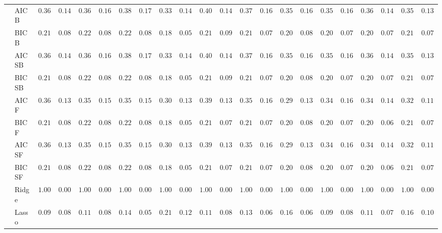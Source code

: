 \begin{tabular}{p{0.2cm}p{1cm}|p{0.6cm}p{0.6cm}|p{0.6cm}p{0.6cm}p{0.6cm}p{0.6cm}p{0.6cm}p{0.6cm}|p{0.6cm}p{0.6cm}p{0.6cm}p{0.6cm}p{0.6cm}p{0.6cm}|p{0.6cm}p{0.6cm}p{0.6cm}p{0.6cm}p{0.6cm}p{0.6cm}}
 & AIC B  & $0.3667$ & $0.1401$ & $0.3633$ & $0.1681$ & $0.3867$ & $0.1739$ & $0.3350$ & $0.1451$ & $0.4017$ & $0.1423$ & $0.3767$ & $0.1617$ & $0.3500$ & $0.1633$ & $0.3583$ & $0.1648$ & $0.3617$ & $0.1422$ & $0.3583$ & $0.1306$ \\
 & BIC B  & $0.2183$ & $0.0844$ & $0.2200$ & $0.0850$ & $0.2233$ & $0.0861$ & $0.1867$ & $0.0594$ & $0.2183$ & $0.0908$ & $0.2150$ & $0.0760$ & $0.2067$ & $0.0825$ & $0.2067$ & $0.0715$ & $0.2050$ & $0.0705$ & $0.2150$ & $0.0760$ \\
 & AIC SB  & $0.3667$ & $0.1401$ & $0.3633$ & $0.1681$ & $0.3867$ & $0.1739$ & $0.3350$ & $0.1451$ & $0.4017$ & $0.1423$ & $0.3767$ & $0.1617$ & $0.3500$ & $0.1633$ & $0.3583$ & $0.1648$ & $0.3617$ & $0.1422$ & $0.3583$ & $0.1306$ \\
 & BIC SB  & $0.2183$ & $0.0844$ & $0.2200$ & $0.0850$ & $0.2233$ & $0.0861$ & $0.1867$ & $0.0594$ & $0.2183$ & $0.0908$ & $0.2150$ & $0.0760$ & $0.2067$ & $0.0825$ & $0.2067$ & $0.0715$ & $0.2050$ & $0.0705$ & $0.2150$ & $0.0760$ \\
 & AIC F  & $0.3650$ & $0.1375$ & $0.3533$ & $0.1576$ & $0.3550$ & $0.1565$ & $0.3000$ & $0.1340$ & $0.3933$ & $0.1372$ & $0.3500$ & $0.1615$ & $0.2967$ & $0.1373$ & $0.3483$ & $0.1626$ & $0.3417$ & $0.1409$ & $0.3283$ & $0.1195$ \\
 & BIC F  & $0.2167$ & $0.0838$ & $0.2200$ & $0.0850$ & $0.2217$ & $0.0856$ & $0.1867$ & $0.0594$ & $0.2133$ & $0.0789$ & $0.2133$ & $0.0752$ & $0.2050$ & $0.0816$ & $0.2067$ & $0.0715$ & $0.2017$ & $0.0682$ & $0.2167$ & $0.0768$ \\
 & AIC SF  & $0.3650$ & $0.1375$ & $0.3533$ & $0.1576$ & $0.3550$ & $0.1565$ & $0.3000$ & $0.1340$ & $0.3933$ & $0.1372$ & $0.3500$ & $0.1615$ & $0.2967$ & $0.1373$ & $0.3483$ & $0.1626$ & $0.3417$ & $0.1409$ & $0.3283$ & $0.1195$ \\
 & BIC SF  & $0.2167$ & $0.0838$ & $0.2200$ & $0.0850$ & $0.2217$ & $0.0856$ & $0.1867$ & $0.0594$ & $0.2133$ & $0.0789$ & $0.2133$ & $0.0752$ & $0.2050$ & $0.0816$ & $0.2067$ & $0.0715$ & $0.2017$ & $0.0682$ & $0.2167$ & $0.0768$ \\
 & Ridge  & $1.0000$ & $0.0000$ & $1.0000$ & $0.0000$ & $1.0000$ & $0.0000$ & $1.0000$ & $0.0000$ & $1.0000$ & $0.0000$ & $1.0000$ & $0.0000$ & $1.0000$ & $0.0000$ & $1.0000$ & $0.0000$ & $1.0000$ & $0.0000$ & $1.0000$ & $0.0000$ \\
 & Lasso  & $0.0933$ & $0.0831$ & $0.1133$ & $0.0850$ & $0.1467$ & $0.0544$ & $0.2117$ & $0.1205$ & $0.1167$ & $0.0803$ & $0.1350$ & $0.0657$ & $0.1650$ & $0.0690$ & $0.0983$ & $0.0824$ & $0.1167$ & $0.0768$ & $0.1667$ & $0.1059$ \\

\end{tabular}

